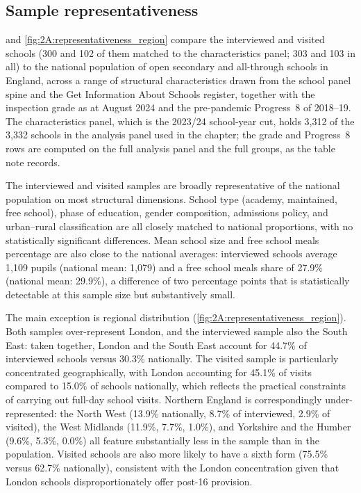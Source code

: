 \subsection{Sample representativeness}
\label{sec:p1_representativeness}

 and \cref{fig:2A:representativeness_region} compare the
interviewed and visited schools (300 and 102 of them matched to the characteristics
panel; 303 and 103 in all) to the national population of open secondary and all-through
schools in England, across a range of structural characteristics drawn from the school
panel spine and the Get Information About Schools register, together with the inspection
grade as at August 2024 and the pre-pandemic Progress~8 of 2018--19. The characteristics
panel, which is the 2023/24 school-year cut, holds 3,312 of the 3,332 schools in the
analysis panel used in the chapter; the grade and Progress~8 rows are computed on the
full analysis panel and the full groups, as the table note records.

The interviewed and visited samples are broadly representative of the national population
on most structural dimensions. School type (academy, maintained, free school), phase of
education, gender composition, admissions policy, and urban--rural classification are all
closely matched to national proportions, with no statistically significant differences.
Mean school size and free school meals percentage are also close to the national averages:
interviewed schools average 1,109 pupils (national mean: 1,079) and a free school meals
share of 27.9\% (national mean: 29.9\%), a difference of two percentage points that
is statistically detectable at this sample size but substantively small.

The main exception is regional distribution
(\cref{fig:2A:representativeness_region}). Both samples over-represent London, and the
interviewed sample also the South East: taken together, London and the South East account for
44.7\% of interviewed schools versus 30.3\% nationally. The visited sample is
particularly concentrated geographically, with London accounting for 45.1\% of visits compared
to 15.0\% of schools nationally, which reflects the practical constraints of carrying out
full-day school visits. Northern England is correspondingly under-represented: the North
West (13.9\% nationally, 8.7\% of interviewed, 2.9\% of visited), the West Midlands
(11.9\%, 7.7\%, 1.0\%), and Yorkshire and the Humber (9.6\%, 5.3\%, 0.0\%) all feature
substantially less in the sample than in the population. Visited schools are also more
likely to have a sixth form (75.5\% versus 62.7\% nationally), consistent with the London
concentration given that London schools disproportionately offer post-16 provision.

